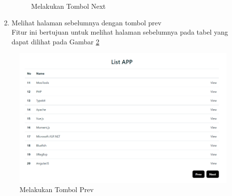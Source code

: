 \begin{enumerate}
\begin{figure}[H]
		\caption{Melakukan Tombol Next} 
		\label{fig:next} 
	\end{figure}
	\item Melihat halaman sebelumnya dengan tombol prev\\
	Fitur ini bertujuan untuk melihat halaman sebelumnya pada tabel yang dapat dilihat pada Gambar \ref{fig:prev}
\end{enumerate}
\begin{figure}[H]
	\centering  
	\includegraphics[scale=0.5]{Gambar/pengujian3.png}  
	\caption{Melakukan Tombol Prev} 
	\label{fig:prev} 
\end{figure}


